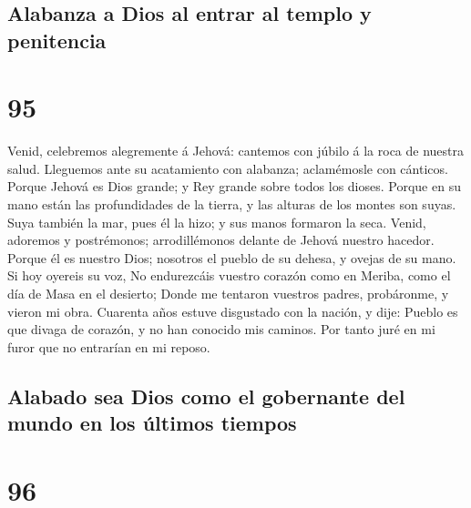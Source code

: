 \hypertarget{alabanza-a-dios-al-entrar-al-templo-y-penitencia}{%
\subsection{Alabanza a Dios al entrar al templo y
penitencia}\label{alabanza-a-dios-al-entrar-al-templo-y-penitencia}}

\hypertarget{section-94}{%
\section{95}\label{section-94}}

 Venid, celebremos alegremente á Jehová: cantemos con
júbilo á la roca de nuestra salud.  Lleguemos ante su
acatamiento con alabanza; aclamémosle con cánticos. 
Porque Jehová es Dios grande; y Rey grande sobre todos los dioses.
 Porque en su mano están las profundidades de la tierra, y
las alturas de los montes son suyas.  Suya también la mar,
pues él la hizo; y sus manos formaron la seca.  Venid,
adoremos y postrémonos; arrodillémonos delante de Jehová nuestro
hacedor.  Porque él es nuestro Dios; nosotros el pueblo de
su dehesa, y ovejas de su mano. Si hoy oyereis su voz,  No
endurezcáis vuestro corazón como en Meriba, como el día de Masa en el
desierto;  Donde me tentaron vuestros padres, probáronme,
y vieron mi obra.  Cuarenta años estuve disgustado con la
nación, y dije: Pueblo es que divaga de corazón, y no han conocido mis
caminos.  Por tanto juré en mi furor que no entrarían en
mi reposo.

\hypertarget{alabado-sea-dios-como-el-gobernante-del-mundo-en-los-uxfaltimos-tiempos}{%
\subsection{Alabado sea Dios como el gobernante del mundo en los últimos
tiempos}\label{alabado-sea-dios-como-el-gobernante-del-mundo-en-los-uxfaltimos-tiempos}}

\hypertarget{section-95}{%
\section{96}\label{section-95}}

